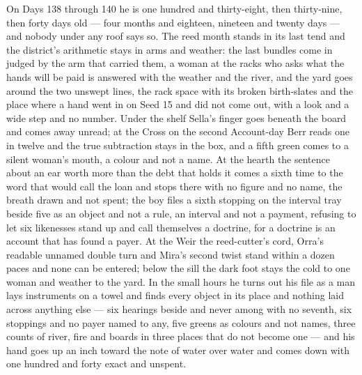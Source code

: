 \documentclass{design/chronicle}
\begin{document}
{On Days 138 through 140 he is one hundred and thirty-eight, then thirty-nine, then forty days old --- four months and eighteen, nineteen and twenty days --- and nobody under any roof says so. The reed month stands in its last tend and the district’s arithmetic stays in arms and weather: the last bundles come in judged by the arm that carried them, a woman at the racks who asks what the hands will be paid is answered with the weather and the river, and the yard goes around the two unswept lines, the rack space with its broken birth-slates and the place where a hand went in on Seed 15 and did not come out, with a look and a wide step and no number. Under the shelf Sella’s finger goes beneath the board and comes away unread; at the Cross on the second Account-day Berr reads one in twelve and the true subtraction stays in the box, and a fifth green comes to a silent woman’s mouth, a colour and not a name. At the hearth the sentence about an ear worth more than the debt that holds it comes a sixth time to the word that would call the loan and stops there with no figure and no name, the breath drawn and not spent; the boy files a sixth stopping on the interval tray beside five as an object and not a rule, an interval and not a payment, refusing to let six likenesses stand up and call themselves a doctrine, for a doctrine is an account that has found a payer. At the Weir the reed-cutter’s cord, Orra’s readable unnamed double turn and Mira’s second twist stand within a dozen paces and none can be entered; below the sill the dark foot stays the cold to one woman and weather to the yard. In the small hours he turns out his file as a man lays instruments on a towel and finds every object in its place and nothing laid across anything else --- six hearings beside and never among with no seventh, six stoppings and no payer named to any, five greens as colours and not names, three counts of river, fire and boards in three places that do not become one --- and his hand goes up an inch toward the note of water over water and comes down with one hundred and forty exact and unspent.

}
\end{document}
